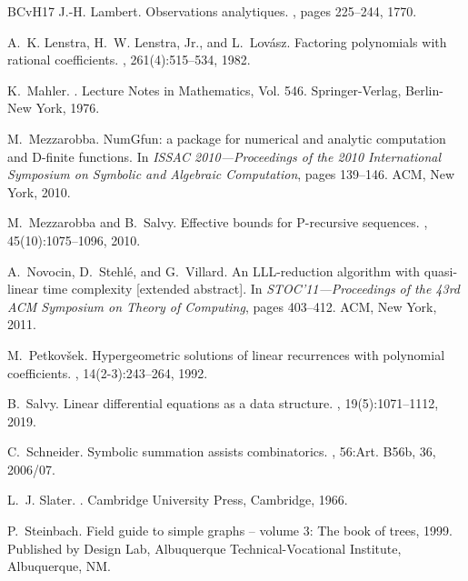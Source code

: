 \documentclass[12pt]{amsart}
\theoremstyle{plain}
\theoremstyle{remark}
\begin{document}
\begin{thebibliography}{BCvH{\etalchar{+}}17}
J.-H. Lambert.
\newblock Observations analytiques.
, pages 225--244, 1770.

A.~K. Lenstra, H.~W. Lenstra, Jr., and L.~Lov\'{a}sz.
\newblock Factoring polynomials with rational coefficients.
, 261(4):515--534, 1982.

K.~Mahler.
.
\newblock Lecture Notes in Mathematics, Vol. 546. Springer-Verlag, Berlin-New
  York, 1976.

M.~Mezzarobba.
\newblock Num{G}fun: a package for numerical and analytic computation and
  {D}-finite functions.
\newblock In {\em I{SSAC} 2010---{P}roceedings of the 2010 {I}nternational
  {S}ymposium on {S}ymbolic and {A}lgebraic {C}omputation}, pages 139--146.
  ACM, New York, 2010.

M.~Mezzarobba and B.~Salvy.
\newblock Effective bounds for {P}-recursive sequences.
, 45(10):1075--1096, 2010.

A.~Novocin, D.~Stehl\'{e}, and G.~Villard.
\newblock An {LLL}-reduction algorithm with quasi-linear time complexity
  [extended abstract].
\newblock In {\em S{TOC}'11---{P}roceedings of the 43rd {ACM} {S}ymposium on
  {T}heory of {C}omputing}, pages 403--412. ACM, New York, 2011.

M.~Petkov\v{s}ek.
\newblock Hypergeometric solutions of linear recurrences with polynomial
  coefficients.
, 14(2-3):243--264, 1992.

B.~Salvy.
\newblock Linear differential equations as a data structure.
, 19(5):1071--1112, 2019.

C.~Schneider.
\newblock Symbolic summation assists combinatorics.
, 56:Art. B56b, 36, 2006/07.

L.~J. Slater.
.
\newblock Cambridge University Press, Cambridge, 1966.

P.~Steinbach.
\newblock Field guide to simple graphs -- volume 3: The book of trees, 1999.
\newblock Published by Design Lab, Albuquerque Technical-Vocational Institute,
  Albuquerque, NM.


\end{thebibliography}
\end{document}
